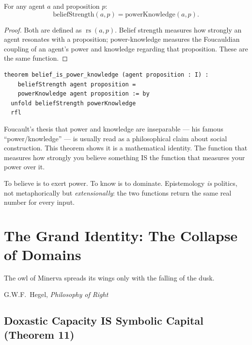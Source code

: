 \begin{theorem}
\label{thm:belief-power}
For any agent $a$ and proposition $p$:
\[
\text{beliefStrength}(a, p) = \text{powerKnowledge}(a, p).
\]
\end{theorem}

\begin{proof}
Both are defined as $\operatorname{rs}(a, p)$.  Belief strength measures how strongly an agent resonates with a proposition; power-knowledge measures the Foucauldian coupling of an agent's power and knowledge regarding that proposition.  These are the same function.
\end{proof}

\begin{lstlisting}
theorem belief_is_power_knowledge (agent proposition : I) :
    beliefStrength agent proposition =
    powerKnowledge agent proposition := by
  unfold beliefStrength powerKnowledge
  rfl
\end{lstlisting}

\begin{paradox}
Foucault's thesis that power and knowledge are inseparable --- his famous ``power/knowledge'' --- is usually read as a philosophical claim about social construction.  This theorem shows it is a mathematical identity.  The function that measures how strongly you believe something IS the function that measures your power over it.

To believe is to exert power.  To know is to dominate.  Epistemology \emph{is} politics, not metaphorically but \emph{extensionally}: the two functions return the same real number for every input.
\end{paradox}


\chapter{The Grand Identity: The Collapse of Domains}

\epigraph{The owl of Minerva spreads its wings only with the falling of the dusk.}{G.W.F.\ Hegel, \textit{Philosophy of Right}}

\section{Doxastic Capacity IS Symbolic Capital (Theorem 11)}

